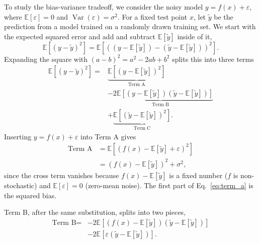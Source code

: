 \documentclass[amssymb,twocolumn,aps]{revtex4}
\begin{document}
To study the bias-variance tradeoff, we consider the noisy model $y=f(x)+\varepsilon,$
where $\mathbb{E}[\varepsilon]=0$ and $\operatorname{Var}(\varepsilon)=\sigma^2$. For a fixed test point $x$, let $\tilde y$ be the prediction from a model trained on a randomly drawn training set. We start with the expected squared error and add and subtract $\mathbb{E}[\tilde{y}]$ inside of it,
\[
    \mathbb{E}\left[(y-\tilde{y})^2\right]
    =
    \mathbb{E}\left[
        \left(
        \left(y-\mathbb{E}[\tilde{y}]\right)
        -
        \left(\tilde{y}-\mathbb{E}[\tilde{y}]\right)
        \right)^2
        \right].
\]
Expanding the square with $(a-b)^2=a^2-2ab+b^2$ splits this into three terms
\[
    \begin{aligned}
        \mathbb{E}\left[(y-\tilde{y})^2\right]
        ={} &
        \underbrace{\mathbb{E}\left[\left(y-\mathbb{E}[\tilde{y}]\right)^2\right]}_{\text{Term A}}                                                   \\
            & \underbrace{-2\mathbb{E}\left[\left(y-\mathbb{E}[\tilde{y}]\right)\left(\tilde{y}-\mathbb{E}[\tilde{y}]\right)\right]}_{\text{Term B}} \\
            & +
        \underbrace{\mathbb{E}\left[\left(\tilde{y}-\mathbb{E}[\tilde{y}]\right)^2\right]}_{\text{Term C}}.
    \end{aligned}
\]
Inserting $y=f(x)+\varepsilon$ into Term A gives
\begin{equation}
    \begin{aligned}
        \text{Term A}
         & =
        \mathbb{E}\left[
            \left(f(x)-\mathbb{E}[\tilde{y}]+\varepsilon\right)^2
        \right] \\
         & =
        \left(f(x)-\mathbb{E}[\tilde{y}]\right)^2
        +\sigma^2,
    \end{aligned}
    \label{eq:term_a}
\end{equation}
since the cross term vanishes because $f(x)-\mathbb{E}[\tilde{y}]$ is a fixed number ($f$ is non-stochastic) and $\mathbb{E}[\varepsilon]=0$ (zero-mean noise). The first part of Eq.~\eqref{eq:term_a} is the squared bias.

Term B, after the same substitution, splits into two pieces,
\[
    \begin{aligned}
        \text{Term B}
        ={} &
        -2\mathbb{E}\left[
            \left(f(x)-\mathbb{E}[\tilde{y}]\right)
            \left(\tilde{y}-\mathbb{E}[\tilde{y}]\right)
        \right]                  \\
            & -2\mathbb{E}\left[
            \varepsilon\left(\tilde{y}-\mathbb{E}[\tilde{y}]\right)
            \right].
    \end{aligned}
\]
\end{document}
